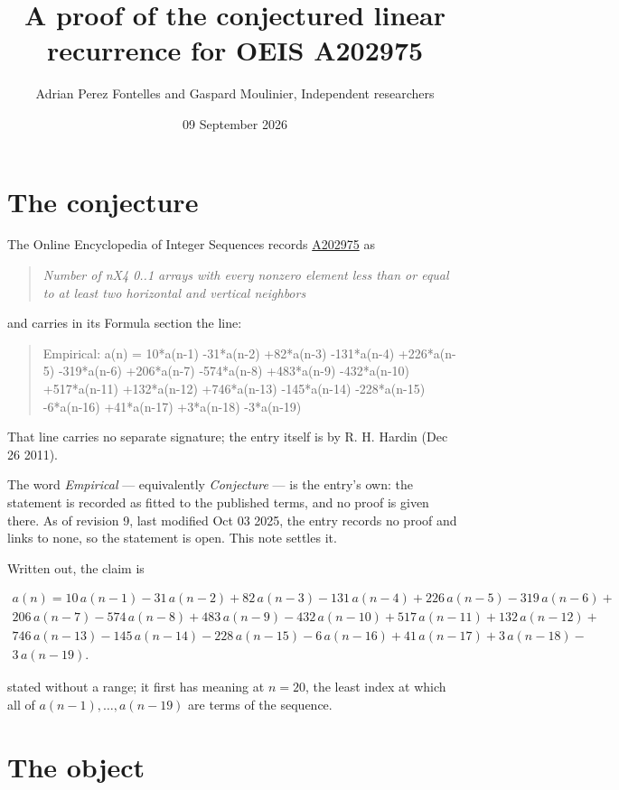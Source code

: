 \documentclass[11pt]{article}
\title{A proof of the conjectured linear recurrence for OEIS A202975}
\author{Adrian Perez Fontelles and Gaspard Moulinier, Independent researchers}
\date{09 September 2026}
\theoremstyle{definition}
\begin{document}
\maketitle
\section{The conjecture}

The Online Encyclopedia of Integer Sequences records \href{https://oeis.org/A202975}{A202975} as

\begin{quote}\itshape Number of nX4 0..1 arrays with every nonzero element less than or equal to at least two horizontal and vertical neighbors\end{quote}

and carries in its Formula section the line:

\begin{quote}\ttfamily Empirical: a(n) = 10*a(n-1) -31*a(n-2) +82*a(n-3) -131*a(n-4) +226*a(n-5) -319*a(n-6) +206*a(n-7) -574*a(n-8) +483*a(n-9) -432*a(n-10) +517*a(n-11) +132*a(n-12) +746*a(n-13) -145*a(n-14) -228*a(n-15) -6*a(n-16) +41*a(n-17) +3*a(n-18) -3*a(n-19)\end{quote}

That line carries no separate signature; the entry itself is by R. H. Hardin (Dec 26 2011).

The word {\itshape Empirical} --- equivalently {\itshape Conjecture} --- is the entry's own: the statement is recorded as fitted to the published terms, and no proof is given there. As of revision 9, last modified Oct 03 2025, the entry records no proof and links to none, so the statement is open. This note settles it.

Written out, the claim is

\begin{multline*} a(n) = 10\,a(n-1) - 31\,a(n-2) + 82\,a(n-3) - 131\,a(n-4) + 226\,a(n-5) - 319\,a(n-6) + \\ 206\,a(n-7) - 574\,a(n-8) + 483\,a(n-9) - 432\,a(n-10) + 517\,a(n-11) + 132\,a(n-12) + \\ 746\,a(n-13) - 145\,a(n-14) - 228\,a(n-15) - 6\,a(n-16) + 41\,a(n-17) + 3\,a(n-18) - \\ 3\,a(n-19). \end{multline*}

stated without a range; it first has meaning at $n = 20$, the least index at which all of $a(n-1),\dots,a(n-19)$ are terms of the sequence.

\section{The object}
\end{document}
